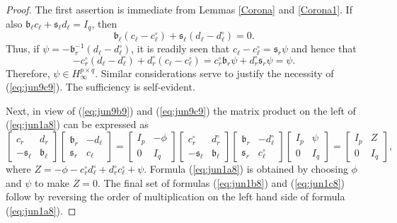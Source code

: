 \documentclass[12pt,twoside,a4paper]{amsart}
\theoremstyle{definition}
\numberwithin{equation}{section}
\begin{document}
\begin{proof} The first assertion is immediate from
Lemmas \ref{Corona} and \ref{Corona1}. If also
${{\mathfrak b}}_\ell c_\ell+{{\mathfrak s}}_\ell d_\ell=I_q$, then
$$
{{\mathfrak b}}_\ell (c_\ell-c_\ell^\circ)+{{\mathfrak s}}_\ell(d_\ell-d_\ell^\circ)=0.
$$
Thus, if $\psi=-{{\mathfrak b}}_r^{-1}(d_\ell-d_\ell^\circ)$, it is readily seen that
$c_\ell-c_\ell^\circ={{\mathfrak s}}_r\psi$ and hence that
$$
-c_r^\circ(d_\ell-d_\ell^\circ)+d_r^\circ(c_\ell-c_\ell^\circ)=
c_r^\circ {{\mathfrak b}}_r\psi+d_r^\circ {{\mathfrak s}}_r\psi=\psi.
$$
Therefore, $\psi\in H_\infty^{p\times q}$. Similar considerations serve to justify
the necessity of  (\ref{eq:jun9c9}). The sufficiency is self-evident.

Next, in view of (\ref{eq:jun9b9}) and (\ref{eq:jun9c9}) the matrix product
on the left of (\ref{eq:jun1a8}) can be expressed as
$$
\begin{bmatrix}c_r&d_r\\-{{\mathfrak s}}_\ell&{{\mathfrak b}}_\ell\end{bmatrix}
\begin{bmatrix}{{\mathfrak b}}_r&-d_\ell\\ {{\mathfrak s}}_r&c_\ell\end{bmatrix}=
\begin{bmatrix}I_p&-\phi\\0&I_q\end{bmatrix}
\begin{bmatrix}c_r^\circ&d_r^\circ\\-{{\mathfrak s}}_\ell&{{\mathfrak b}}_\ell\end{bmatrix}
\begin{bmatrix}{{\mathfrak b}}_r&-d_\ell^\circ\\ {{\mathfrak s}}_r&c_\ell^\circ\end{bmatrix}
\begin{bmatrix}I_p&\psi\\
0&I_q\end{bmatrix}=\begin{bmatrix}I_p&Z\\
0&I_q\end{bmatrix},
$$
where $Z=-\phi-c_r^\circ
d_\ell^\circ+d_r^\circ c_\ell^\circ+\psi$. Formula
(\ref{eq:jun1a8}) is obtained by choosing  $\phi$ and $\psi$ to make $Z=0$.
The final set of
formulas
(\ref{eq:jun1b8}) and (\ref{eq:jun1c8}) follow by reversing the order of
multiplication on  the left hand side of formula (\ref{eq:jun1a8}).
\end{proof}
\end{document}
